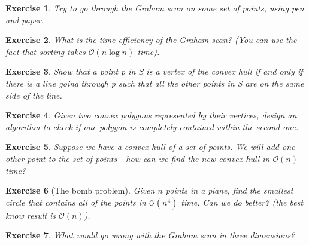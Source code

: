 \documentclass{article}
\newtheorem{exercise}{Exercise}
\begin{document}
\break

\begin{exercise}
Try to go through the Graham scan on some set of points, using pen and paper.
\end{exercise}

\begin{exercise}
What is the time efficiency of the Graham scan? (You can use the fact that sorting takes $\mathcal{O}(n \log{n})$ time).
\end{exercise}

\begin{exercise}
Show that a point p in S is a vertex of the convex hull if and only if there is a line going through p such that all the other points in S are on the same side of the line.
\end{exercise}

\begin{exercise}
Given two convex polygons represented by their vertices, design an algorithm to check if one polygon is completely contained within the second one.
\end{exercise}

\begin{exercise}
Suppose we have a convex hull of a set of points. We will add one other point to the set of points - how can we find the new convex hull in $\mathcal{O}(n)$ time?
\end{exercise}

\begin{exercise}[The bomb problem]
Given $n$ points in a plane, find the smallest circle that contains all of the points in $\mathcal{O}(n^4)$ time. Can we do better? (the best know result is $\mathcal{O}(n)$).
\end{exercise}

\begin{exercise}
What would go wrong with the Graham scan in three dimensions?
\end{exercise}
\end{document}
